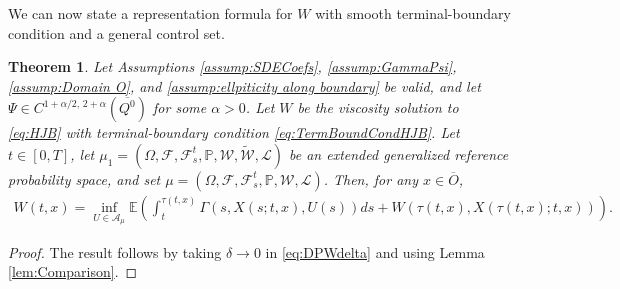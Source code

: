 \documentclass[amscd,amssymb,11pt]{article}
\newtheorem{theorem}{Theorem}
\numberwithin{theorem}{section}
\numberwithin{equation}{section}
\begin{document}
We can now state a representation formula for $W$ with smooth terminal-boundary condition and a general control set.
\begin{theorem}\label{thm:DPVisSmoothTermBound}
Let Assumptions \ref{assump:SDECoefs}, \ref{assump:GammaPsi}, \ref{assump:Domain O}, and \ref{assump:ellpiticity along boundary} be valid, and let $\Psi\in C^{1+\alpha/2,\,2+\alpha}(\overline{Q^{0}})$ for some $\alpha>0$. Let $W$ be the viscosity solution to \eqref{eq:HJB} with terminal-boundary condition \eqref{eq:TermBoundCondHJB}. Let $t\in[0,T]$, let $\mu_{1}=(\Omega,\mathscr{F},\mathscr{F}_{s}^{t},\mathbb{P},\mathcal{W},\widetilde{\mathcal{W}},\mathcal{L})$ be an extended generalized reference probability space, and set $\mu=(\Omega,\mathscr{F},\mathscr{F}_{s}^{t},\mathbb{P},\mathcal{W},\mathcal{L})$. Then, for any $x\in\overline{O}$,
\begin{align}\label{eq:DPmain result}
W(t,x)=\inf_{U\in\mathcal{A}_{\mu}}\mathbb{E}\left(\int_{t}^{\tau(t,x)}\Gamma\left(s,X(s;t,x),U(s)\right)ds+W\left(\tau(t,x),X(\tau(t,x);t,x)\right)\right).
\end{align}
\end{theorem}
\begin{proof}
The result follows by taking $\delta\rightarrow 0$ in \eqref{eq:DPWdelta} and using Lemma \ref{lem:Comparison}.
\end{proof}
\end{document}
